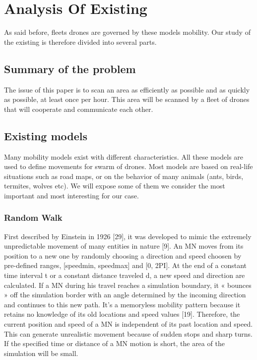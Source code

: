 \chapter{Analysis Of Existing}

As said before, fleets drones are governed by these models mobility. Our study of the existing is therefore divided into several parts.

\section{Summary of the problem}

The issue of this paper is to scan an area as efficiently as possible and as quickly as possible, at least once per hour. This area will be scanned by a fleet of drones that will cooperate and communicate each other.

\section{Existing models}

Many mobility models exist with different characteristics. All these models are used to define movements for swarm of drones. Most models are based on real-life situations such as road maps, or on the behavior of many animals (ants, birds, termites, wolves etc). We will expose some of them we consider the most important and most interesting for our case.

\subsection{Random Walk}

First described by Einstein in 1926 [29], it was developed to mimic the extremely unpredictable movement of many entities in nature [9]. An MN moves from its position to a new one by randomly choosing a direction and speed choosen by pre-defined ranges, [speedmin, speedmax] and [0, 2PI]. At the end of a constant time interval t or a constant distance traveled d, a new speed and direction are calculated. If a MN during his travel reaches a simulation boundary, it « bounces » off the simulation border with an angle determined by the incoming direction and continues to this new path.
It's a memoryless mobility pattern because it retains no knowledge of its old locations and speed values [19]. Therefore, the current position and speed of a MN is independent of its past location and speed. This can generate unrealistic movement because of sudden stops and sharp turns. If the specified time or distance of a MN motion is short, the area of the simulation will be small.

